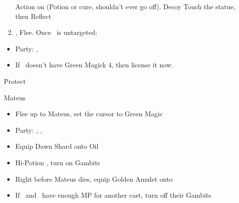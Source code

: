 \begin{enumerate}[resume]
	      \penelof Action on \vaan (Potion or cure, shouldn't ever go off).
	      \ashef Decoy \vaan
	      \vaanf Touch the statue, then Reflect \vaan
	\item \leader{\penelo}, Flee. Once \vaan\ is untargeted:
\end{enumerate}
\begin{menu}
	\begin{itemize}
		\item Party: \basch, \balthier
		      \battleslow
		\item If \penelo\ doesn't have Green Magick 4, then license it now.
	\end{itemize}
\end{menu}
\begin{enumerate}[resume]
	\balthierf Protect \basch
\end{enumerate}
\begin{battle}{Mateus}
	\begin{itemize}
		\item Flee up to Mateus, set the cursor to Green Magic
		\item Party: \vaan, \ashe, \penelo
		\item Equip Dawn Shard onto \vaan
		      \penelof Oil \penelo
		\item \GirlsGambitOn
		      \vaanf Hi-Potion \vaan, turn on Gambits
		\item Right before Mateus dies, equip Golden Amulet onto \vaan
		\item If \ashe\ and \penelo\ have enough MP for another cast, turn off their Gambits
	\end{itemize}
\end{battle}
